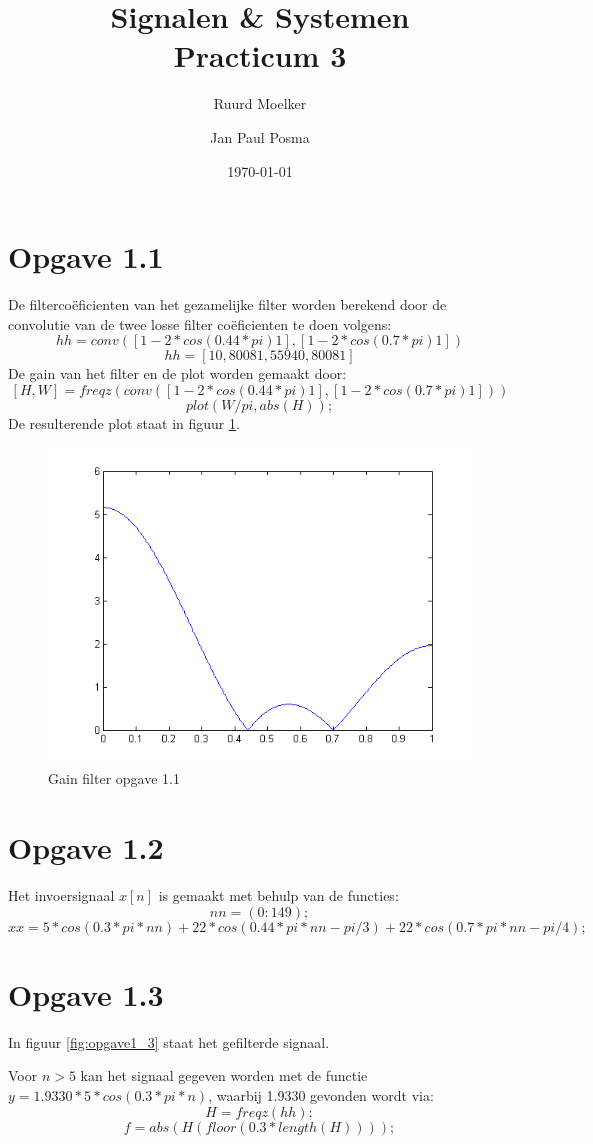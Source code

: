 \documentclass{article}
\author{Ruurd Moelker \and Jan Paul Posma}
\date{\today}
\title{Signalen \& Systemen \\Practicum 3}
\begin{document}
\maketitle
 
\section{Opgave 1.1}
De filterco\"eficienten van het gezamelijke filter worden berekend door de convolutie van de twee losse filter co\"eficienten te doen volgens:
$$hh = conv([1 -2*cos(0.44*pi) 1], [1 -2*cos(0.7*pi) 1])$$
$$hh = [1 0,8008 1,5594 0,8008 1]$$
De gain van het filter en de plot worden gemaakt door:
$$[H, W] = freqz( conv([1 -2*cos(0.44*pi) 1], [1 -2*cos(0.7*pi) 1]) )$$
$$plot(W/pi, abs(H));$$
De resulterende plot staat in figuur \ref{fig:opgave1_1}.

\begin{figure}[h]
	\includegraphics[width=.8\textwidth]{content/1_1.png}
	\caption{Gain filter opgave 1.1}
	\label{fig:opgave1_1}
\end{figure}

\newpage
\section{Opgave 1.2}
Het invoersignaal $x[n]$ is gemaakt met behulp van de functies:
$$nn = (0:149);$$
$$xx = 5*cos(0.3*pi*nn) + 22 * cos(0.44*pi*nn - pi/3) + 22 * cos (0.7*pi*nn - pi/4);$$


\section{Opgave 1.3}
In figuur \ref{fig:opgave1_3} staat het gefilterde signaal.

Voor $n>5$ kan het signaal gegeven worden met de functie $y = 1.9330 * 5*cos(0.3*pi*n)$, waarbij 1.9330 gevonden wordt via:
$$H = freqz(hh);$$
$$f = abs(H(floor(0.3*length(H))));$$
\end{document}
